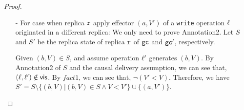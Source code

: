 \begin {proof}
\begin{itemize}
    Given operations $\alabel_1$ and $\alabel_2$, such that $(b_1,V_1)$ and $(b_2,V_2)$ is the effector of $\alabel_1$ and $\alabel_2$, respectively. Given replica $\arep_1$, let $S_{b1}$ (resp., $S_{b2}$) be the set of {\tt write} operations $\alabel'$ happen on replica $\arep_1$, and either $\alabel'$ is visible to $\alabel_1$, or $\alabel' = \alabel_1$ (resp., and either $\alabel'$ is visible to $\alabel_2$, or $\alabel' = \alabel_2$). By the causal delivery assumption, the visibility relation is transitive. By Annotation1 of $(b_1,V_1)$ and $(b_2,V_2)$, we can see that, $( S_{b1} \subseteq S_{b2} ) \vee ( S_{b2} \subseteq S_{b1} )$. %

    Let $\mathcal{V} = \{ V \vert (\_,V) \in S \}$ be the set of vector clocks of $S$. By Annotation2 of $S$ and Annotation1 of effectors of $S$,
    we can see that, for each replica $\arep' \neq \arep$, $max_{V \in \mathcal{V}} V[\arep']$ is the number of {\tt write} operations happen on replica $\arep'$ and whose effectors been applied in replica $\arep$ during $\aglobalstate_0 \xrightarrow{}^* \aglobalstate$, and $max_{V \in \mathcal{V}} V[\arep]$ is the number of operations happen on replica $\arep$ during $\aglobalstate_0 \xrightarrow{}^* \aglobalstate$. Then, for each replica $\arep' \neq \arep$, $V'[\arep'] = max_{V \in \mathcal{V}} V[\arep']$, and $V'[\arep] = max_{V \in \mathcal{V}} V[\arep] +1$. Therefore, Annotation1 still holds for the effector $(a,V')$. %

\item[-] For case when replica $\arep$ apply effector $(a,V')$ of a {\tt write} operation $\ell$ originated in a different replica: We only need to prove Annotation2. Let $S$ and $S'$ be the replica state of replica $\arep$ of $\mathtt{gc}$ and $\mathtt{gc}'$, respectively.

    Given $(b,V) \in S$, and assume operation $\alabel'$ generates $(b,V)$. By Annotation2 of $S$ and the causal delivery assumption, we can see that, $(\ell,\ell') \notin \mathsf{vis}$. By $fact1$, we can see that, $\neg (V' < V)$. Therefore, we have $S' = S \setminus \{ (b,V) \vert (b,V) \in S \wedge V < V' \} \cup \{ (a,V') \}$.


\end{itemize}
\end{proof}
